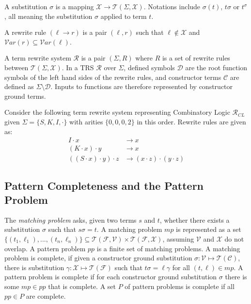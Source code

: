 A substitution $\sigma$ is a mapping $\mathcal{X} \rightarrow \mathcal{T}(\Sigma, \mathcal{X})$. Notations include $\sigma(t)$, $t\sigma$ or $t^\sigma$, all meaning the substitution $\sigma$ applied to term $t$. 

A rewrite rule $(\ell \rightarrow r)$ is a pair $(\ell, r)$ such that $\ell \notin \mathcal{X}$ and $\mathcal{V}ar(r) \subseteq \mathcal{V}ar(\ell)$.

A term rewrite system $\mathcal{R}$ is a pair $(\Sigma, R)$ where $R$ is a set of rewrite rules between $\mathcal{T}(\Sigma, \mathcal{X})$. In a TRS $\mathcal{R}$ over $\Sigma$, defined symbols $\mathcal{D}$ are the root function symbols of the left hand sides of the rewrite rules, and constructor terms $\mathcal{C}$ are defined as $\Sigma \setminus \mathcal{D}$. Inputs to functions are therefore represented by constructor ground terms.

\begin{example}
Consider the following term rewrite system representing Combinatory Logic $\mathcal{R}_{CL}$ given $\Sigma = \{S, K, I, \cdot\}$ with arities $\{0,0,0,2\}$ in this order. Rewrite rules are given as:
\begin{align*}
    I \cdot x &\rightarrow x \\
    (K \cdot x) \cdot y &\rightarrow x \\
    ((S \cdot x) \cdot y) \cdot z &\rightarrow (x \cdot z) \cdot (y \cdot z)
\end{align*}
\end{example}

\subsection{Pattern Completeness and the Pattern Problem} \label{def-pattern-complete}
The \textit{matching problem} asks, given two terms $s$ and $t$, whether there exists a substitution $\sigma$ such that $s\sigma = t$. A matching problem $mp$ is represented as a set $\{(t_1, \ell_1), ..., (t_n, \ell_n)\} \subseteq \mathcal{T}(\mathcal{F}, \mathcal{V}) \times \mathcal{T}(\mathcal{F}, \mathcal{X})$, assuming $\mathcal{V}$ and $\mathcal{X}$ do not overlap. A pattern problem $pp$ is a finite set of matching problems. A matching problem is complete, if given a constructor ground substitution $\sigma : \mathcal{V} \mapsto \mathcal{T}(\mathcal{C})$, there is substitution $\gamma : \mathcal{X} \mapsto \mathcal{T}(\mathcal{F})$ such that $t\sigma = \ell\gamma$ for all $(t, \ell) \in mp$. A pattern problem is complete if for each constructor ground substitution $\sigma$ there is some $mp \in pp$ that is complete. A set $P$ of pattern problems is complete if all $pp \in P$ are complete. 

